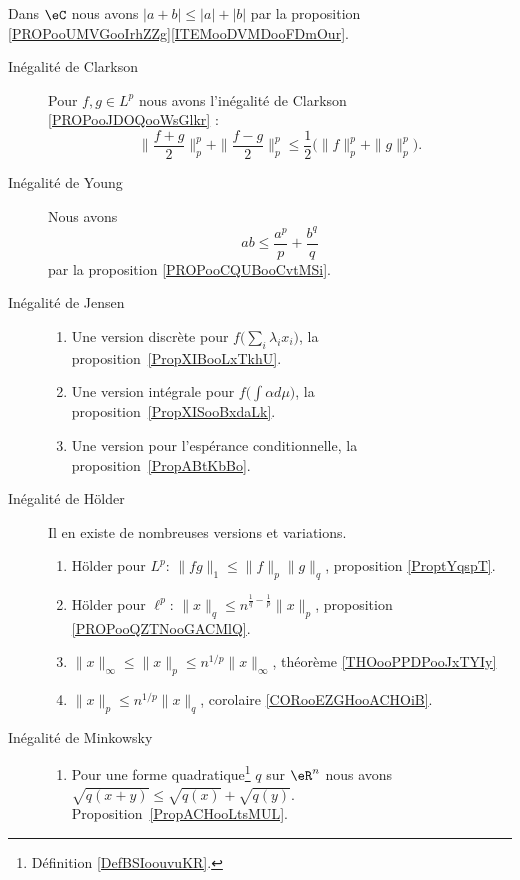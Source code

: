 	\label{THEMEooInegalitesNormesAutres}
Dans \( \eC\) nous avons \( | a+ b|\leq | a |+| b |\) par la proposition \ref{PROPooUMVGooIrhZZg}\ref{ITEMooDVMDooFDmOur}.
\begin{description}
	\item[Inégalité de Clarkson]
		Pour \( f,g\in L^p\) nous avons l'inégalité de Clarkson \ref{PROPooJDOQooWsGlkr} :
		\begin{equation}
			\| \frac{ f+g }{2} \|_p^p+\| \frac{ f-g }{2} \|_p^p\leq \frac{ 1 }{2}\Big( \| f \|_p^p+\| g \|_p^p \Big).
		\end{equation}
	\item[Inégalité de Young]
		Nous avons
		\begin{equation}
			ab\leq \frac{ a^p }{ p }+\frac{ b^q }{ q }
		\end{equation}
		par la proposition \ref{PROPooCQUBooCvtMSi}.
	\item[Inégalité de Jensen]
		\begin{enumerate}
			\item
			      Une version discrète pour \( f\big( \sum_i\lambda_ix_i \big)\), la proposition~\ref{PropXIBooLxTkhU}.
			\item
			      Une version intégrale pour \( f\big( \int \alpha d\mu \big)\), la proposition~\ref{PropXISooBxdaLk}.
			\item
			      Une version pour l'espérance conditionnelle, la proposition~\ref{PropABtKbBo}.
		\end{enumerate}
	\item[Inégalité de Hölder]
		Il en existe de nombreuses versions et variations.
		\begin{enumerate}
			\item
			      Hölder pour \( L^p\): \( \| fg \|_1\leq \| f \|_p\| g \|_q\), proposition \ref{ProptYqspT}.
			\item
			      Hölder pour \( \ell^p\): \( \| x \|_q\leq n^{\frac{1}{ q }-\frac{1}{ p }}\| x \|_p\), proposition \ref{PROPooQZTNooGACMlQ}.
			\item
			      $\| x \|_{\infty}\leq \| x \|_p\leq n^{1/p}\| x \|_{\infty}$, théorème \ref{THOooPPDPooJxTYIy}
			\item
			      $\| x \|_p\leq n^{1/p} \| x \|_q$, corolaire \ref{CORooEZGHooACHOiB}.
		\end{enumerate}
	\item[Inégalité de Minkowsky]
		\begin{enumerate}
			\item
			      Pour une forme quadratique\footnote{Définition \ref{DefBSIoouvuKR}.} \( q\) sur \( \eR^n\) nous avons \( \sqrt{q(x+y)}\leq\sqrt{q(x)}+\sqrt{q(y)}\). Proposition~\ref{PropACHooLtsMUL}.

\end{enumerate}
\end{description}
